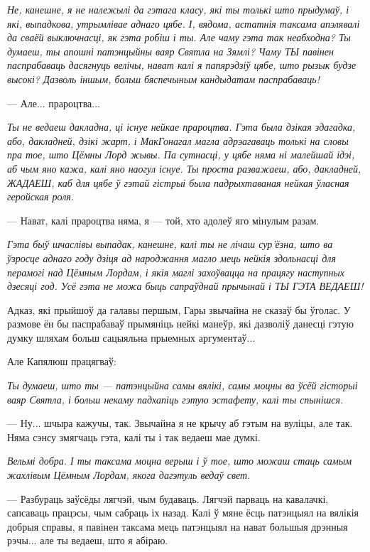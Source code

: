 \emph{Не, канешне, я не належылі да гэтага класу, які ты толькі што прыдумаў,
і які, выпадкова, утрымлівае аднаго цябе. І, вядома, астатнія таксама 
апэлявалі да сваёй выключнасці, як гэта робіш і ты. Але чаму гэта так неабходна?
Ты думаеш, ты апошні патэнцыйны ваяр Святла на Зямлі? Чаму ТЫ павінен паспрабаваць 
дасягнуць велічы, нават калі я папярэдзіў цябе, што рызык будзе высокі?
Дазволь іншым, больш бяспечыным кандыдатам паспрабаваць!}

--- Але... прароцтва...

\emph{Ты не ведаеш дакладна, ці існуе нейкае прароцтва. Гэта была дзікая здагадка,
або, дакладней, дзікі жарт, і МакГонагал магла адрэагаваць толькі на словы пра 
тое, што Цёмны Лорд жывы. Па сутнасці, у цябе няма ні малейшай ідэі, аб чым яно кажа, 
калі яно наогул існуе. Ты проста разважаеш, або, дакладней, ЖАДАЕШ, каб 
для цябе ў гэтай гістрыі была падрыхтаваная нейкая ўласная геройская роля.}

--- Нават, калі прароцтва няма, я --- той, хто адолеў яго мінулым разам.

\emph{Гэта быў шчаслівы выпадак, канешне, калі ты не лічаш сур'ёзна, што 
ва ўзросце аднаго году дзіця ад народжання магло мець нейкія здольнасці для перамогі
над Цёмным Лордам, і якія маглі захоўвацца на працягу наступных дзесяці год. 
Усё гэта не можа быць сапраўднай прычынай і ТЫ ГЭТА ВЕДАЕШ!}


Адказ, які прыйшоў да галавы першым, Гары звычайна не сказаў бы ўголас. У размове ён бы паспрабаваў 
прымяніць нейкі манеўр, які дазволіў данесці гэтую думку шляхам больш сацыяльна 
прыемных аргументаў... 

Але Капялюш працягваў:

\emph{Ты думаеш, што ты --- патэнцыйна самы вялікі, самы моцны ва ўсёй гісторыі ваяр Святла,
і больш некаму падхапіць гэтую эстафету, калі ты спынішся.}

--- Ну... шчыра кажучы, так. Звычайна я не крычу аб гэтым на вуліцы, але так. 
Няма сэнсу змягчаць гэта, калі ты і так ведаеш мае думкі.

\emph{Вельмі добра. І ты таксама моцна верыш і ў тое, што можаш стаць самым жахлівым
Цёмным Лордам, якога дагэтуль ведаў свет.}

--- Разбураць заўсёды лягчэй, чым будаваць. Лягчэй парваць на кавалачкі, 
сапсаваць працэсы, чым сабраць іх назад. Калі ў мяне ёсць патэнцыял на вялікія добрыя
справы, я павінен таксама мець патэнцыял на нават большыя дрэнныя рэчы... але 
ты ведаеш, што я абіраю.

